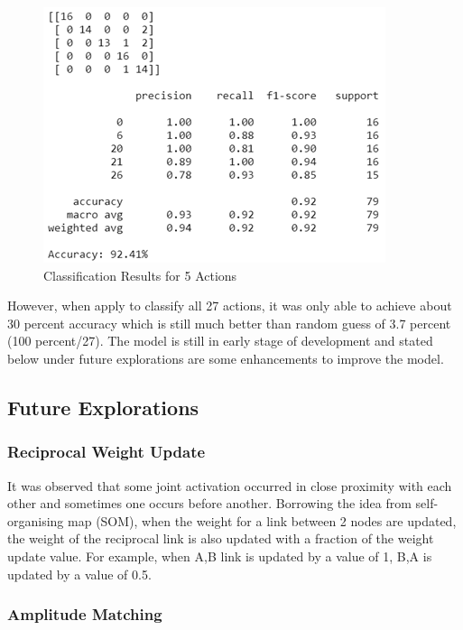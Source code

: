 \documentclass[conference]{IEEEtran}
\begin{document}
\begin{figure}[H]
\begin{center}
\includegraphics[scale=1]{Image/Graph_Model_Accuracy.png}
\caption{\label{fig:Graph_Model_accuracy} Classification Results for 5 Actions}
\end{center}
\end{figure}

However, when apply to classify all 27 actions, it was only able to achieve about 30 percent accuracy which is still much better than random guess of 3.7 percent (100 percent/27). The model is still in early stage of development and stated below under future explorations are some enhancements to improve the model. 

\subsection{Future Explorations}

\subsubsection{Reciprocal Weight Update}

It was observed that some joint activation occurred in close proximity with each other and sometimes one occurs before another. Borrowing the idea from self-organising map (SOM), when the weight for a link between 2 nodes are updated, the weight of the reciprocal link is also updated with a fraction of the weight update value. For example, when A,B link is updated by a value of 1, B,A is updated by a value of 0.5.

\subsubsection{Amplitude Matching}
\end{document}
